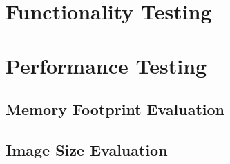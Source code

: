 \section{Functionality Testing}
\label{sec:functionality-testing}


\section{Performance Testing}
\label{sec:performance-testing}

\subsection{Memory Footprint Evaluation}
\label{subsec:memory-footprint-evaluation}

\subsection{Image Size Evaluation}
\label{subsec:image-size-evaluation}

